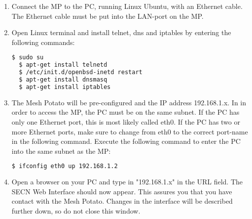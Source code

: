

\begin{enumerate}
\item Connect the MP to the PC, running Linux Ubuntu, with an Ethernet cable. The Ethernet cable must be put into the LAN-port on the MP. 

\item Open Linux terminal and install telnet, dns and iptables by entering the following commands: 
\noindent
\begin{lstlisting}[language=bash]
  $ sudo su
  $ apt-get install telnetd
  $ /etc/init.d/openbsd-inetd restart 
  $ apt-get install dnsmasq
  $ apt-get install iptables
\end{lstlisting}

\item The Mesh Potato will be pre-configured and the IP address 192.168.1.x. In in order to access the MP, the PC must be on the same subnet. If the PC has only one Ethernet port, this is most likely called eth0. If the PC has two or more Ethernet ports, make sure to change from eth0 to the correct port-name in the following command. Execute the following command to enter the PC into the same subnet as the MP: 
\noindent
\begin{lstlisting}[language=bash]
  $ ifconfig eth0 up 192.168.1.2
\end{lstlisting}

\item Open a browser on your PC and type in "192.168.1.x" in the URL field. The SECN Web Interface should now appear. This assures you that you have contact with the Mesh Potato. Changes in the interface will be described further down, so do not close this window.  


\end{enumerate}
